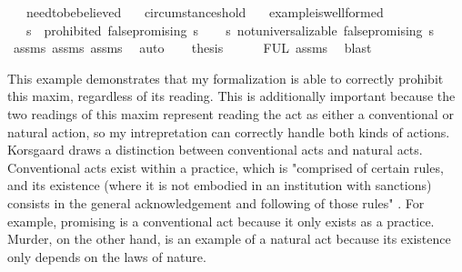 \begin{isabellebody}
\ \ \ need{\isacharunderscore}to{\isacharunderscore}be{\isacharunderscore}believed\isanewline
%
\isanewline
\ \ \ circumstances{\isacharunderscore}hold\isanewline
\ \ \ example{\isacharunderscore}is{\isacharunderscore}well{\isacharunderscore}formed\isanewline
%
\isanewline
\ \ \ {\isachardoublequoteopen}{\isasymforall}s{\isachardot}\ {\isasymTurnstile}\ {\isacharparenleft}prohibited\ false{\isacharunderscore}promising\ s{\isacharparenright}{\isachardoublequoteclose}\isanewline
%
\isadelimproof
%
\endisadelimproof
%
\isatagproof
{}\isamarkupfalse%
{\isacharminus}\isanewline
\ \ \isamarkupfalse%
\ {\isachardoublequoteopen}{\isasymforall}s{\isachardot}\ not{\isacharunderscore}universalizable\ false{\isacharunderscore}promising\ s{\isachardoublequoteclose}\isanewline
\ \ \ \ \isamarkupfalse%
\ assms{\isacharparenleft}{}{\isacharparenright}\ assms{\isacharparenleft}{}{\isacharparenright}\ assms{\isacharparenleft}{}{\isacharparenright}\ \isamarkupfalse%
\ auto\isanewline
\ \ \isamarkupfalse%
\ {\isacharquery}thesis\isanewline
\ \ \ \ \isamarkupfalse%
\ FUL\ assms{\isacharparenleft}{}{\isacharparenright}\ \isamarkupfalse%
\ blast\isanewline
{}\isamarkupfalse%
\isanewline
%
%
\endisatagproof
{\isafoldproof}%
%
\isadelimproof
%
\endisadelimproof
%
\begin{isamarkuptext}%
This example demonstrates that my formalization is able to correctly prohibit this maxim, regardless
of its reading. This is additionally important because the two readings of this maxim represent reading 
the act as either a conventional or natural action, so my intrepretation can correctly handle both kinds
of actions. Korsgaard draws a distinction between conventional acts and natural acts. Conventional acts 
exist within a practice, which is "comprised of certain rules, and its existence (where it is not embodied in 
an institution with sanctions) consists in the general acknowledgement and following of those rules" 
\cite[10]{KorsgaardFUL}. For example, promising is a conventional act because it only exists as a 
practice. Murder, on the other hand, is an example of a natural act because its existence only depends
on the laws of nature\cite[11]{KorsgaardFUL}.


\end{isamarkuptext}
\end{isabellebody}
